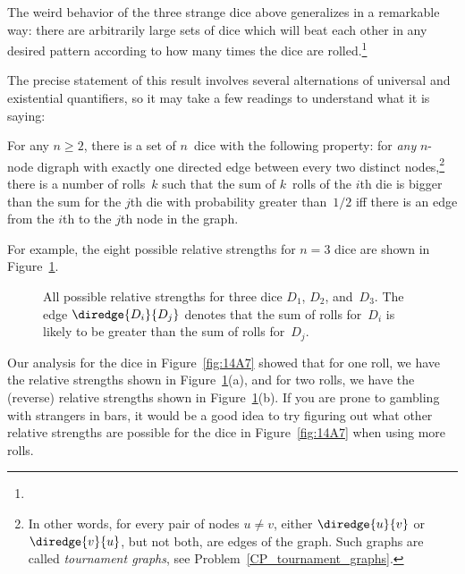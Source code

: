 
The weird behavior of the three strange dice above generalizes in a
remarkable way: there are arbitrarily large sets of dice which will
beat each other in any desired pattern according to how many times the
dice are rolled.\footnote{}

\begin{editingnotes}
The precise statement of this result involves several
alternations of universal and existential quantifiers, so it may take
a few readings to understand what it is saying:

\iffalse Now that we know that strange things can happen with strange
dice, it is natural, at least for mathematicians, to ask how strange
things can get.  It turns out that things can get very strange.  In
fact, mathematicians recently made the following discovery:\fi

\begin{theorem}\label{thm:14F2}
For any $n \ge 2$, there is a set of $n$~dice with the following
property: for \emph{any} $n$-node digraph with exactly one directed
edge between every two distinct nodes,\footnote{In other words, for
  every pair of nodes $u \neq v$, either $\diredge{u}{v}$ or
  $\diredge{v}{u}$, but not both, are edges of the graph.  Such graphs
  are called \emph{tournament graphs}, see
  Problem~\ref{CP_tournament_graphs}.} there is a number of rolls~$k$
such that the sum of $k$~rolls of the $i$th die is bigger than the sum
for the $j$th die with probability greater than~$1/2$ iff there is an
edge from the $i$th to the $j$th node in the graph.
\end{theorem}

For example, the eight possible relative strengths for $n =
3$ dice are shown in Figure~\ref{fig:14A13}.  

\begin{figure}


\caption{All possible relative strengths for three dice $D_1$, $D_2$,
  and~$D_3$.  The edge $\diredge{D_i}{D_j}$ denotes that the sum of
  rolls for~$D_i$ is likely to be greater than the sum of rolls
  for~$D_j$.}

\label{fig:14A13}

\end{figure}

Our analysis for the dice in Figure~\ref{fig:14A7} showed that for
one roll, we have the relative strengths shown in
Figure~\ref{fig:14A13}(a), and for two rolls, we have the (reverse)
relative strengths shown in Figure~\ref{fig:14A13}(b).  If you are
prone to gambling with strangers in bars, it would be a good idea to
try figuring out what other relative strengths are possible for the
dice in Figure~\ref{fig:14A7} when using more rolls.
\end{editingnotes}


